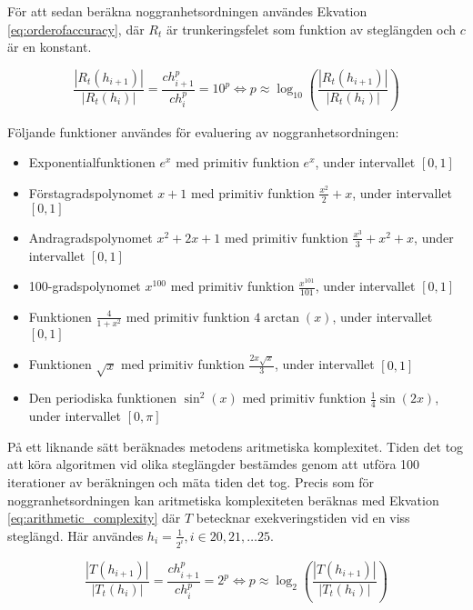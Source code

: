 \documentclass[a4paper,titlepage]{article}
\begin{document}
För att sedan beräkna noggranhetsordningen användes Ekvation
\ref{eq:orderofaccuracy}, där $R_t$
är trunkeringsfelet som funktion av steglängden och $c$ är en konstant.

\begin{equation}
    \label{eq:orderofaccuracy}
    \frac{| R_t(h_{i+1})|}{| R_t(h_{i})|}  = \frac{ch_{i+1}^p}{ch_{i}^p} = 10^p
    \Leftrightarrow p \approx \log_{10}\left( \frac{| R_t(h_{i+1})|}{| R_t(h_{i})|} \right)
\end{equation}

Följande funktioner användes för evaluering av noggranhetsordningen:

\begin{itemize}
    \item Exponentialfunktionen $e^x$ med primitiv funktion $e^x$, under intervallet $[0, 1]$
    \item Förstagradspolynomet $x + 1$ med primitiv funktion $\frac{x^2}{2} + x$, under intervallet $[0, 1]$
    \item Andragradspolynomet $x^2 + 2x + 1$ med primitiv funktion
        $\frac{x^3}{3} + x^2 + x$, under intervallet $[0, 1]$
    \item 100-gradspolynomet $x^{100}$ med primitiv funktion
        $\frac{x^{101}}{101}$, under intervallet $[0, 1]$
    \item Funktionen $\frac{4}{1 + x^2}$ med primitiv funktion $4\arctan(x)$, under intervallet $[0, 1]$
    \item Funktionen $\sqrt x$ med primitiv funktion $\frac{2 x\sqrt x}{3}$, under intervallet $[0, 1]$
    \item Den periodiska funktionen $\sin^2(x)$ med primitiv funktion
        $\frac{1}{4}\sin(2x)$, under intervallet $[0, \pi]$
\end{itemize}

På ett liknande sätt beräknades metodens aritmetiska komplexitet. Tiden det tog att köra
algoritmen vid olika steglängder bestämdes genom att utföra 100 iterationer av beräkningen
och mäta tiden det tog. Precis som för noggranhetsordningen kan aritmetiska komplexiteten
beräknas med Ekvation \ref{eq:arithmetic_complexity} där $T$ betecknar exekveringstiden
vid en viss steglängd. Här användes $h_i = \frac{1}{2^i}, i \in {20,21, \dots
25}$.

\begin{equation}
    \label{eq:arithmetic_complexity}
    \frac{| T(h_{i+1})|}{| T_t(h_{i})|}  = \frac{ch_{i+1}^p}{ch_{i}^p} = 2^p
    \Leftrightarrow p \approx \log_{2}\left( \frac{| T(h_{i+1})|}{| T_t(h_{i})|} \right)
\end{equation}
\end{document}
